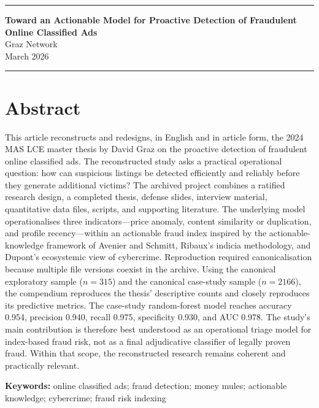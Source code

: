 \documentclass[11pt,a4paper]{article}
\begin{document}
{\color{accent}\rule{\textwidth}{1.2pt}}
\begin{center}
    {\LARGE\bfseries Toward an Actionable Model for Proactive Detection of Fraudulent Online Classified Ads}\\[0.4em]
    {\large Graz Network}\\[0.8em]
    {\small March 2026}
\end{center}
{\color{accent}\rule{\textwidth}{0.6pt}}

\section*{Abstract}
This article reconstructs and redesigns, in English and in article form, the 2024 MAS LCE master thesis by David Graz on the proactive detection of fraudulent online classified ads. The reconstructed study asks a practical operational question: how can suspicious listings be detected efficiently and reliably before they generate additional victims? The archived project combines a ratified research design, a completed thesis, defense slides, interview material, quantitative data files, scripts, and supporting literature. The underlying model operationalises three indicators---price anomaly, content similarity or duplication, and profile recency---within an actionable fraud index inspired by the actionable-knowledge framework of Avenier and Schmitt, Ribaux's indicia methodology, and Dupont's ecosystemic view of cybercrime. Reproduction required canonicalisation because multiple file versions coexist in the archive. Using the canonical exploratory sample ($n=315$) and the canonical case-study sample ($n=2166$), the compendium reproduces the thesis' descriptive counts and closely reproduces its predictive metrics. The case-study random-forest model reaches accuracy 0.954, precision 0.940, recall 0.975, specificity 0.930, and AUC 0.978. The study's main contribution is therefore best understood as an operational triage model for index-based fraud risk, not as a final adjudicative classifier of legally proven fraud. Within that scope, the reconstructed research remains coherent and practically relevant.

\textbf{Keywords:} online classified ads; fraud detection; money mules; actionable knowledge; cybercrime; fraud risk indexing

\newpage

\tableofcontents

\newpage
\end{document}

